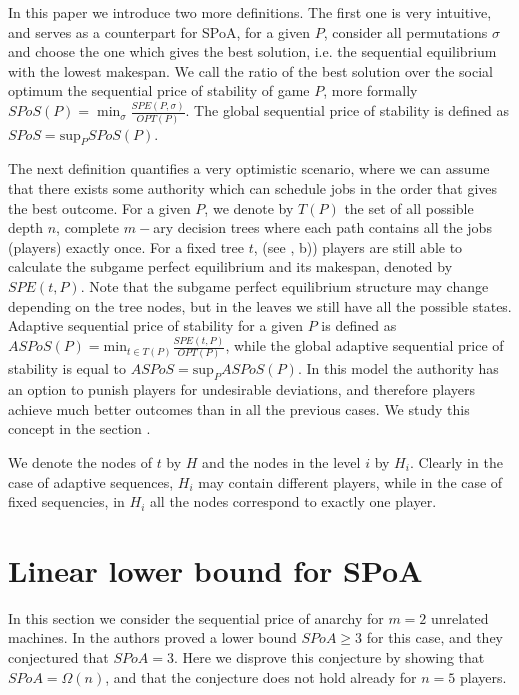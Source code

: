 \documentclass[12pt,a4paper]{article}
\theoremstyle{definition}
\theoremstyle{remark}
\newcommand{\SPoA}{SPoA}
\begin{document}
In this paper we introduce two more definitions. The first one is very intuitive, and serves as a counterpart for \SPoA, for a given $P$, consider all permutations $\sigma$ and choose the one which gives the best solution, i.e. the sequential equilibrium with the lowest makespan. We call the ratio of the best solution over the social optimum the sequential price of stability of game $P$, more formally $SPoS(P) = \min_{\sigma}\frac{SPE(P,\sigma)}{OPT(P)}$. The global sequential price of stability is defined as $SPoS = \text{sup}_{P}SPoS(P)$.

The next definition quantifies a very optimistic scenario, where we can assume that there exists some authority which can schedule jobs in the order that gives the best outcome. For a given $P$, we denote by $T(P)$ the set of all possible depth $n$, complete $m-$ary  decision trees where each path contains all the jobs (players) exactly once. For a fixed tree $t$, (see , b)) players are still able to calculate the subgame perfect equilibrium and its makespan, denoted by $SPE(t,P)$. Note that the subgame perfect equilibrium structure may change depending on the tree nodes, but in the leaves we still have all the possible states. Adaptive sequential price of stability for a given $P$ is  defined as $ASPoS(P) = \text{min}_{t\in T(P)}\frac{SPE(t,P)}{OPT(P)}$, while the global adaptive sequential price of stability is equal to $ASPoS = \text{sup}_P{ASPoS(P)}$. In this model the authority has an option to punish players for undesirable deviations, and therefore players achieve much better outcomes than in all the previous cases. We study this concept in the section . 

We denote the nodes of $t$ by $H$ and the nodes in the level $i$ by $H_i$. Clearly in the case of adaptive sequences, $H_i$ may contain different players, while in the case of fixed sequencies, in $H_i$ all the nodes correspond to exactly one player. 

\section{Linear lower bound for \SPoA}\label{sec:counterexample}

In this section we consider the sequential price of anarchy for $m=2$ unrelated machines. In \cite{Hassin} the authors proved a lower bound $\SPoA\geq 3$ for this case, and they conjectured that $\SPoA=3$. Here we disprove this conjecture by showing that $\SPoA = \Omega(n)$, and that the conjecture does not hold already for $n=5$ players.
\end{document}
